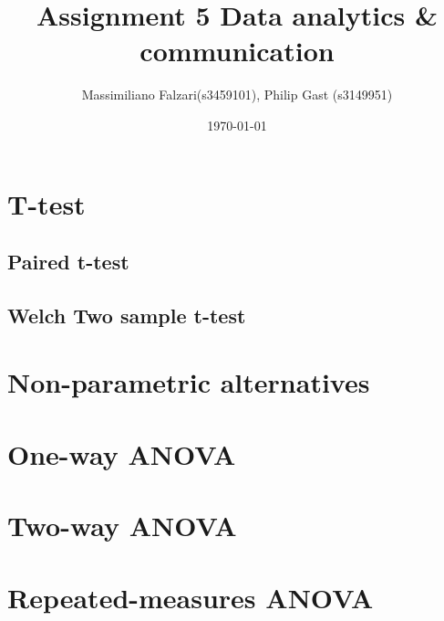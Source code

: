 \documentclass[11pt]{article}
\author{Massimiliano Falzari(s3459101),  Philip Gast (s3149951)}
\date{\today}
\title{Assignment 5 Data analytics \& communication}
\begin{document}
\maketitle
\tableofcontents

\section{T-test}
\label{sec:orgffd4b6b}
\subsection{Paired t-test}
\label{sec:orge47ee96}
\subsection{Welch Two sample t-test}
\label{sec:orgb97d50b}
\section{Non-parametric alternatives}
\label{sec:org6e8dd42}
\section{One-way ANOVA}
\label{sec:org8e9730b}
\section{Two-way ANOVA}
\label{sec:org48a9fa0}
\section{Repeated-measures ANOVA}
\label{sec:org0c5349d}
\end{document}
